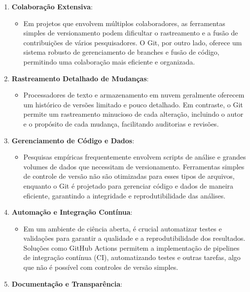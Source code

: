 \documentclass[
  a4paper,
]{article}
\providecommand{\tightlist}{%
  \setlength{\itemsep}{0pt}\setlength{\parskip}{0pt}}\usepackage{longtable,booktabs,array}
\begin{document}
\begin{enumerate}
\def\labelenumi{\arabic{enumi}.}
\tightlist
\item
  \textbf{Colaboração Extensiva}:

  \begin{itemize}
  \tightlist
  \item
    Em projetos que envolvem múltiplos colaboradores, as ferramentas
    simples de versionamento podem dificultar o rastreamento e a fusão
    de contribuições de vários pesquisadores. O Git, por outro lado,
    oferece um sistema robusto de gerenciamento de branches e fusão de
    código, permitindo uma colaboração mais eficiente e organizada.
  \end{itemize}
\item
  \textbf{Rastreamento Detalhado de Mudanças}:

  \begin{itemize}
  \tightlist
  \item
    Processadores de texto e armazenamento em nuvem geralmente oferecem
    um histórico de versões limitado e pouco detalhado. Em contraste, o
    Git permite um rastreamento minucioso de cada alteração, incluindo o
    autor e o propósito de cada mudança, facilitando auditorias e
    revisões.
  \end{itemize}
\item
  \textbf{Gerenciamento de Código e Dados}:

  \begin{itemize}
  \tightlist
  \item
    Pesquisas empíricas frequentemente envolvem scripts de análise e
    grandes volumes de dados que necessitam de versionamento.
    Ferramentas simples de controle de versão não são otimizadas para
    esses tipos de arquivos, enquanto o Git é projetado para gerenciar
    código e dados de maneira eficiente, garantindo a integridade e
    reprodutibilidade das análises.
  \end{itemize}
\item
  \textbf{Automação e Integração Contínua}:

  \begin{itemize}
  \tightlist
  \item
    Em um ambiente de ciência aberta, é crucial automatizar testes e
    validações para garantir a qualidade e a reprodutibilidade dos
    resultados. Soluções como GitHub Actions permitem a implementação de
    pipelines de integração contínua (CI), automatizando testes e outras
    tarefas, algo que não é possível com controles de versão simples.
  \end{itemize}
\item
  \textbf{Documentação e Transparência}:


\end{enumerate}
\end{document}
